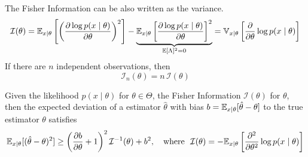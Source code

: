 The Fisher Information can be also written as the variance.
\begin{equation}
	\mathcal{I}(\theta) = \mathbb{E}_{x\mid\theta}\left[\left(\frac{\partial\log p(x \mid \theta)}{\partial \theta}\right)^2 \right] - \underbrace{\mathbb{E}_{x\mid\theta}\left[\frac{\partial\log p(x \mid \theta)}{\partial \theta} \right]^2}_{\mathbb{E}[\Lambda]^2 = 0}
 = \mathbb{V}_{x\mid\theta}\left[\frac{\partial}{\partial \theta} \log p(x \mid \theta)\right]
\end{equation}
If there are $n$ independent observations, then
\begin{equation}
	\mathcal{I}_n(\theta) = n \, \mathcal{I}(\theta)
\end{equation}

\begin{theorem}
	Given the likelihood $p(x \mid \theta)$ for $\theta \in \Theta $, the Fisher Information $\mathcal{I}(\theta)$ for $\theta$, then the expected deviation of a estimator $\hat{\theta}$ with bias $b = \mathbb{E}_{x\mid \theta}[\hat{\theta} - \theta]$ to the true estimator $\theta$ satisfies
$$
		\mathbb{E}_{x\mid \theta}[(\hat{\theta} - \theta)^2] \geq \left(\frac{\partial b}{\partial \theta} + 1\right)^2 \mathcal{I}^{-1}(\theta) + b^2, \quad \text{where}\ \  \mathcal{I}(\theta) = -\mathbb{E}_{x\mid \theta}\left[\frac{\partial^2}{\partial \theta^2} \log p(x\mid \theta)\right]
$$
\end{theorem}
